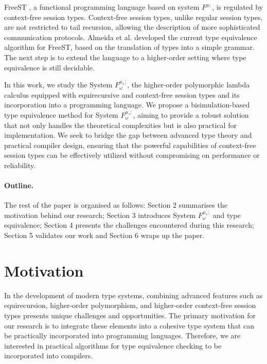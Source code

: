 \documentclass[runningheads,dvipsnames]{llncs}
\begin{document}
FreeST \cite{AlmeidaMTV22}, a functional programming language based on system $F^{\mu;}$, is regulated by context-free session types. Context-free session types, unlike regular session types, are not restricted to tail recursion, allowing the description of more sophisticated communication protocols. Almeida et al. \cite{AlmeidaMV20} developed the current type equivalence algorithm for FreeST, based on the translation of types into a simple grammar. The next step is to extend the language to a higher-order setting where type equivalence is still decidable.

In this work, we study the System $F^{\mu_*;}_\omega$, the higher-order polymorphic lambda calculus equipped with equirecursive and context-free session types and its incorporation into a programming language. We propose a bisimulation-based type equivalence method for System $F^{\mu_*;}_\omega$,  aiming to provide a robust solution that not only handles the theoretical complexities but is also practical for implementation. We seek to bridge the gap between advanced type theory and practical compiler design, ensuring that the powerful capabilities of context-free session types can be effectively utilized without compromising on performance or reliability.

\paragraph{Outline.}
The rest of the paper is organised as follows: Section 2 summarises the motivation behind our research; Section 3 introduces System $F^{\mu_*;}_\omega$ and type equivalence; Section 4 presents the challenges encountered during this research; Section 5 validates our work and Section 6 wraps up the paper.

\section{Motivation}
In the development of modern type systems, combining advanced features such as equirecursion, higher-order polymorphism, and higher-order context-free session types presents unique challenges and opportunities. The primary motivation for our research is to integrate these elements into a cohesive type system that can be practically incorporated into programming languages. Therefore, we are interested in practical algorithms for type equivalence checking to be incorporated into compilers.
\end{document}
